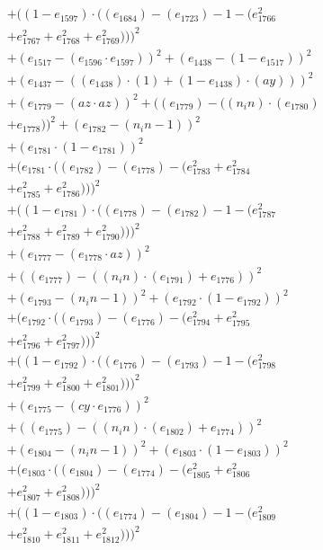 \documentclass[10pt, a4paper]{article}
\begin{document}
\begin{small}
\begin{align*}
& + ((1 - e_{1597})  \cdot  ((e_{1684}) - (e_{1723}) - 1 - (e_{1766}^{2} \\
& + e_{1767}^{2} + e_{1768}^{2} + e_{1769}^{2})))^{2} \\
& + (e_{1517} - (e_{1596}  \cdot  e_{1597}))^{2} + (e_{1438} - (1 - e_{1517}))^{2} \\
& + (e_{1437} - ((e_{1438})  \cdot  (1) + (1 - e_{1438})  \cdot  (ay)))^{2} \\
& + (e_{1779} - (az  \cdot  az))^{2} + ((e_{1779}) - ((n_in)  \cdot  (e_{1780}) \\
& + e_{1778}))^{2} + (e_{1782} - (n_in - 1))^{2} \\
& + (e_{1781}  \cdot  (1 - e_{1781}))^{2} \\
& + (e_{1781}  \cdot  ((e_{1782}) - (e_{1778}) - (e_{1783}^{2} + e_{1784}^{2} \\
& + e_{1785}^{2} + e_{1786}^{2})))^{2} \\
& + ((1 - e_{1781})  \cdot  ((e_{1778}) - (e_{1782}) - 1 - (e_{1787}^{2} \\
& + e_{1788}^{2} + e_{1789}^{2} + e_{1790}^{2})))^{2} \\
& + (e_{1777} - (e_{1778}  \cdot  az))^{2} \\
& + ((e_{1777}) - ((n_in)  \cdot  (e_{1791}) + e_{1776}))^{2} \\
& + (e_{1793} - (n_in - 1))^{2} + (e_{1792}  \cdot  (1 - e_{1792}))^{2} \\
& + (e_{1792}  \cdot  ((e_{1793}) - (e_{1776}) - (e_{1794}^{2} + e_{1795}^{2} \\
& + e_{1796}^{2} + e_{1797}^{2})))^{2} \\
& + ((1 - e_{1792})  \cdot  ((e_{1776}) - (e_{1793}) - 1 - (e_{1798}^{2} \\
& + e_{1799}^{2} + e_{1800}^{2} + e_{1801}^{2})))^{2} \\
& + (e_{1775} - (cy  \cdot  e_{1776}))^{2} \\
& + ((e_{1775}) - ((n_in)  \cdot  (e_{1802}) + e_{1774}))^{2} \\
& + (e_{1804} - (n_in - 1))^{2} + (e_{1803}  \cdot  (1 - e_{1803}))^{2} \\
& + (e_{1803}  \cdot  ((e_{1804}) - (e_{1774}) - (e_{1805}^{2} + e_{1806}^{2} \\
& + e_{1807}^{2} + e_{1808}^{2})))^{2} \\
& + ((1 - e_{1803})  \cdot  ((e_{1774}) - (e_{1804}) - 1 - (e_{1809}^{2} \\
& + e_{1810}^{2} + e_{1811}^{2} + e_{1812}^{2})))^{2} \\

\end{align*}
\end{small}
\end{document}
